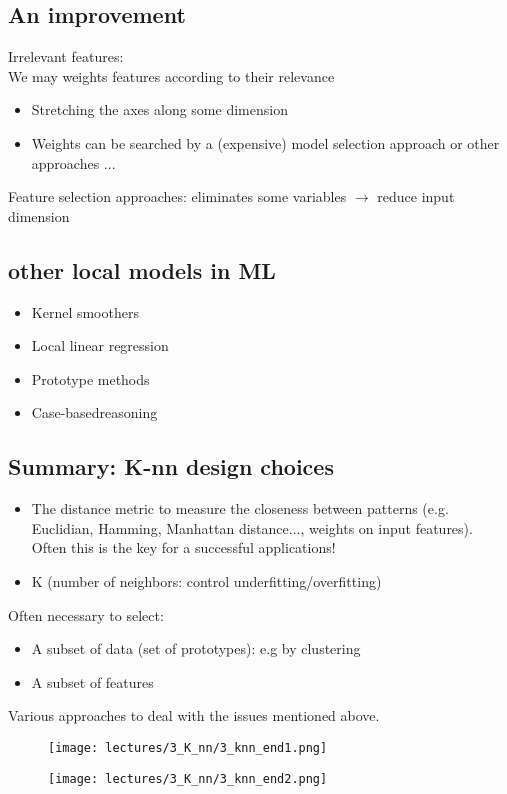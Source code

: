 \documentclass[../main.tex]{subfiles}
\begin{document}
\subsection{An improvement}
Irrelevant features:\\
We may weights features according to their relevance
\begin{itemize}
    \item Stretching the axes along some dimension
    \item Weights can be searched by a (expensive) model selection approach or other approaches ...
\end{itemize}
Feature selection approaches: eliminates some variables $\rightarrow$ reduce input dimension

\subsection{other local models in ML}
\begin{itemize}
    \item Kernel smoothers
    \item Local linear regression
    \item Prototype methods
    \item Case-basedreasoning
\end{itemize}

\subsection{Summary: K-nn design choices}
\begin{itemize}
    \item The distance metric to measure the closeness between patterns (e.g. Euclidian, Hamming, Manhattan distance..., weights on input features). Often this is the key for a successful applications!
    \item K (number of neighbors: control underfitting/overfitting)
\end{itemize}

Often necessary to select:
\begin{itemize}
    \item A subset of data (set of prototypes): e.g by clustering
    \item A subset of features
\end{itemize}
Various approaches to deal with the issues mentioned above.
\newpage
\begin{figure}[H]
    \centering
    \texttt{[image: lectures/3\_K\_nn/3\_knn\_end1.png]}
\end{figure}

\begin{figure}[H]
    \centering
    \texttt{[image: lectures/3\_K\_nn/3\_knn\_end2.png]}
\end{figure}
\end{document}
